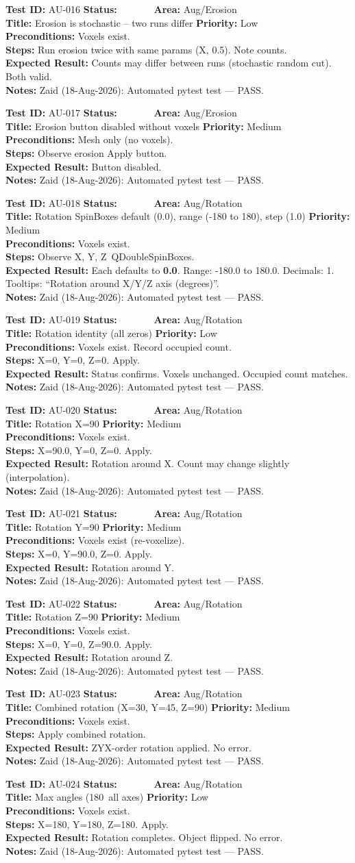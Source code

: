 \documentclass[12pt,a4paper]{article}
\newcommand{\statuspass}{\colorbox{statusgreen}{\textcolor{white}{\textbf{\,PASS\,}}}}
\newcommand{\testcase}[9]{%
  \smallskip
  \noindent\textbf{Test ID:} #1 \hfill \textbf{Status:} #2 \hfill \textbf{Area:} #3 \\
  \textbf{Title:} #4 \hfill \textbf{Priority:} #5 \\[0.3em]
  \textbf{Preconditions:} #6 \\[0.3em]
  \textbf{Steps:} #7 \\[0.3em]
  \textbf{Expected Result:} #8 \\
  \textbf{Notes:} #9
  \smallskip
}
\begin{document}
\testcase{AU-016}{\statuspass}{Aug/Erosion}{Erosion is stochastic -- two runs differ}{Low}{Voxels exist.}{Run erosion twice with same params (X, 0.5). Note counts.}{Counts may differ between runs (stochastic random cut). Both valid.}{Zaid (18-Aug-2026): Automated pytest test --- PASS.}


\testcase{AU-017}{\statuspass}{Aug/Erosion}{Erosion button disabled without voxels}{Medium}{Mesh only (no voxels).}{Observe erosion Apply button.}{Button disabled.}{Zaid (18-Aug-2026): Automated pytest test --- PASS.}


\testcase{AU-018}{\statuspass}{Aug/Rotation}{Rotation SpinBoxes default (0.0), range (-180 to 180), step (1.0)}{Medium}{Voxels exist.}{Observe X\textdegree, Y\textdegree, Z\textdegree\ QDoubleSpinBoxes.}{Each defaults to \textbf{0.0}. Range: -180.0 to 180.0. Decimals: 1. Tooltips: ``Rotation around X/Y/Z axis (degrees)''.}{Zaid (18-Aug-2026): Automated pytest test --- PASS.}


\testcase{AU-019}{\statuspass}{Aug/Rotation}{Rotation identity (all zeros)}{Low}{Voxels exist. Record occupied count.}{X=0, Y=0, Z=0. Apply.}{Status confirms. Voxels unchanged. Occupied count matches.}{Zaid (18-Aug-2026): Automated pytest test --- PASS.}


\testcase{AU-020}{\statuspass}{Aug/Rotation}{Rotation X=90\textdegree}{Medium}{Voxels exist.}{X=90.0\textdegree, Y=0, Z=0. Apply.}{Rotation around X. Count may change slightly (interpolation).}{Zaid (18-Aug-2026): Automated pytest test --- PASS.}


\testcase{AU-021}{\statuspass}{Aug/Rotation}{Rotation Y=90\textdegree}{Medium}{Voxels exist (re-voxelize).}{X=0, Y=90.0\textdegree, Z=0. Apply.}{Rotation around Y.}{Zaid (18-Aug-2026): Automated pytest test --- PASS.}


\testcase{AU-022}{\statuspass}{Aug/Rotation}{Rotation Z=90\textdegree}{Medium}{Voxels exist.}{X=0, Y=0, Z=90.0\textdegree. Apply.}{Rotation around Z.}{Zaid (18-Aug-2026): Automated pytest test --- PASS.}


\testcase{AU-023}{\statuspass}{Aug/Rotation}{Combined rotation (X=30\textdegree, Y=45\textdegree, Z=90\textdegree)}{Medium}{Voxels exist.}{Apply combined rotation.}{ZYX-order rotation applied. No error.}{Zaid (18-Aug-2026): Automated pytest test --- PASS.}


\testcase{AU-024}{\statuspass}{Aug/Rotation}{Max angles (180\textdegree\ all axes)}{Low}{Voxels exist.}{X=180\textdegree, Y=180\textdegree, Z=180\textdegree. Apply.}{Rotation completes. Object flipped. No error.}{Zaid (18-Aug-2026): Automated pytest test --- PASS.}
\end{document}
